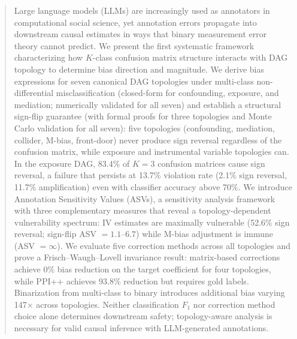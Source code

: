 \begin{abstract}
Large language models (LLMs) are increasingly used as annotators in computational social science, yet annotation errors propagate into downstream causal estimates in ways that binary measurement error theory cannot predict. We present the first systematic framework characterizing how $K$-class confusion matrix structure interacts with DAG topology to determine bias direction and magnitude. We derive bias expressions for seven canonical DAG topologies under multi-class non-differential misclassification (closed-form for confounding, exposure, and mediation; numerically validated for all seven) and establish a structural sign-flip guarantee (with formal proofs for three topologies and Monte Carlo validation for all seven): five topologies (confounding, mediation, collider, M-bias, front-door) never produce sign reversal regardless of the confusion matrix, while exposure and instrumental variable topologies can. In the exposure DAG, 83.4\% of $K{=}3$ confusion matrices cause sign reversal, a failure that persists at 13.7\% violation rate (2.1\% sign reversal, 11.7\% amplification) even with classifier accuracy above 70\%. We introduce Annotation Sensitivity Values (ASVs), a sensitivity analysis framework with three complementary measures that reveal a topology-dependent vulnerability spectrum: IV estimates are maximally vulnerable (52.6\% sign reversal; sign-flip ASV $= 1.1$--$6.7$) while M-bias adjustment is immune (ASV $= \infty$). We evaluate five correction methods across all topologies and prove a Frisch--Waugh--Lovell invariance result: matrix-based corrections achieve 0\% bias reduction on the target coefficient for four topologies, while PPI++ achieves 93.8\% reduction but requires gold labels. Binarization from multi-class to binary introduces additional bias varying 147$\times$ across topologies. Neither classification $F_1$ nor correction method choice alone determines downstream safety; topology-aware analysis is necessary for valid causal inference with LLM-generated annotations.
\end{abstract}
